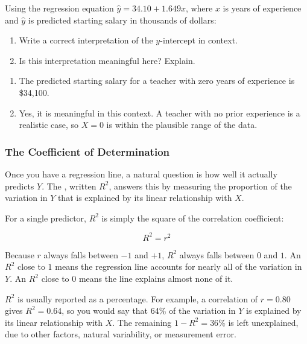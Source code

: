 \begin{Exercise}[title={Interpreting the Intercept}, label={ex:lr_intercept}]
Using the regression equation $\hat{y} = 34.10 + 1.649x$, where $x$ is years of
experience and $\hat{y}$ is predicted starting salary in thousands of dollars:
\begin{enumerate}
    \item Write a correct interpretation of the $y$-intercept in context.
    \item Is this interpretation meaningful here? Explain.
\end{enumerate}
\end{Exercise}
\begin{Answer}[ref={ex:lr_intercept}]
\begin{enumerate}
    \item The predicted starting salary for a teacher with zero years of experience
    is \$34{,}100.
    \item Yes, it is meaningful in this context. A teacher with no prior experience
    is a realistic case, so $X = 0$ is within the plausible range of the data.
\end{enumerate}
\end{Answer}

\subsubsection{The Coefficient of Determination}

Once you have a regression line, a natural question is how well it actually
predicts $Y$. The , written $R^2$, answers this by measuring the proportion of the
variation in $Y$ that is explained by its linear relationship with $X$.

For a single predictor, $R^2$ is simply the square of the correlation
coefficient:

\[
R^2 = r^2
\]

Because $r$ always falls between $-1$ and $+1$, $R^2$ always falls between $0$
and $1$. An $R^2$ close to $1$ means the regression line accounts for nearly
all of the variation in $Y$. An $R^2$ close to $0$ means the line explains
almost none of it.

$R^2$ is usually reported as a percentage. For example, a correlation of
$r = 0.80$ gives $R^2 = 0.64$, so you would say that 64\% of the variation in
$Y$ is explained by its linear relationship with $X$. The remaining
$1 - R^2 = 36\%$ is left unexplained, due to other factors, natural
variability, or measurement error.

